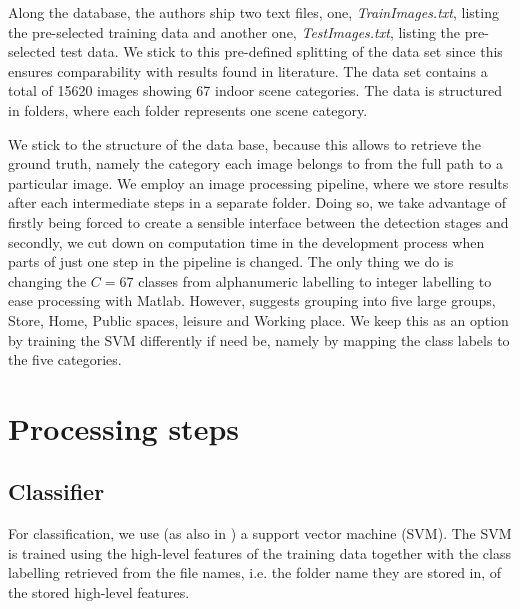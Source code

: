 \documentclass[10pt,twocolumn,letterpaper]{article}
\begin{document}
Along the database, the authors ship two text files, one, \emph{TrainImages.txt}, listing the pre-selected training data and another one, \emph{TestImages.txt}, listing the pre-selected test data. We stick to this pre-defined splitting of the data set since this ensures comparability with results found in literature. The data set contains a total of 15620 images showing 67 indoor scene categories. The data is structured in folders, where each folder represents one scene category. 

We stick to the structure of the data base, because this allows to retrieve the ground truth, namely the category each image belongs to from the full path to a particular image. We employ an image processing pipeline, where we store results after each intermediate steps in a separate folder. Doing so, we take advantage of firstly being forced to create a sensible interface between the detection stages and secondly, we cut down on computation time in the development process when parts of just one step in the pipeline is changed. The only thing we do is changing the $C=67$ classes from alphanumeric labelling to integer labelling to ease processing with Matlab. However, \cite{indoorScenes} suggests grouping into five large groups, Store, Home, Public spaces, leisure and Working place. We keep this as an option by training the SVM differently if need be, namely by mapping the class labels to the five categories.



\section{Processing steps}

\subsection{Classifier}
For classification, we use (as also in \cite{indoorScenes}) a support vector machine (SVM). The SVM is trained using the high-level features of the training data together with the class labelling retrieved from the file names, i.e. the folder name they are stored in, of the stored high-level features.




{\small


}
\end{document}
